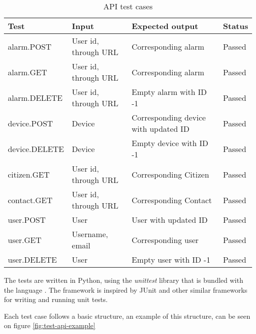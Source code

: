 \begin{table}[H]
\centering
\begin{tabular}{|l|l|l|l|}
\hline
\textbf{Test}          & \textbf{Input}                & \textbf{Expected output}                      & \textbf{Status}                        \\ \hline
alarm.POST    & User id, through URL & Corresponding alarm                  & {\color[HTML]{009901} Passed} \\ \hline
alarm.GET     & User id, through URL & Corresponding alarm                  & {\color[HTML]{009901} Passed} \\ \hline
alarm.DELETE  & User id, through URL & Empty alarm with ID -1               & {\color[HTML]{009901} Passed} \\ \hline
device.POST   & Device               & Corresponding device with updated ID & {\color[HTML]{009901} Passed} \\ \hline
device.DELETE & Device               & Empty device with ID -1              & {\color[HTML]{009901} Passed} \\ \hline
citizen.GET   & User id, through URL & Corresponding Citizen                & {\color[HTML]{009901} Passed} \\ \hline
contact.GET   & User id, through URL & Corresponding Contact                & {\color[HTML]{009901} Passed} \\ \hline
user.POST     & User                 & User with updated ID                 & {\color[HTML]{009901} Passed} \\ \hline
user.GET      & Username, email      & Corresponding user                   & {\color[HTML]{009901} Passed} \\ \hline
user.DELETE   & User                 & Empty user with ID -1                & {\color[HTML]{009901} Passed} \\ \hline
\end{tabular}
\caption{API test cases}
\label{tab:api-tests}
\end{table}


The tests are written in Python, using the \textit{unittest} library that is bundled with the language \cite{unittest}. The framework is inspired by JUnit and other similar frameworks for writing and running unit tests. 

Each test case follows a basic structure, an example of this structure, can be seen on figure \ref{fig:test-api-example}

